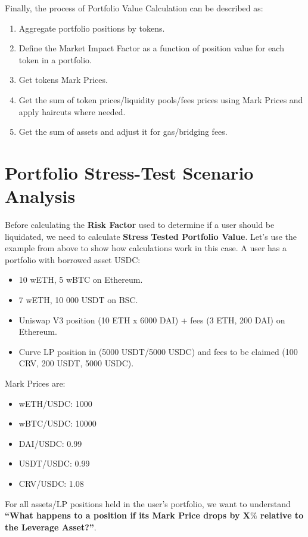\documentclass[conference]{IEEEtran}
\begin{document}
Finally, the process of Portfolio Value Calculation can be described as:
\begin{enumerate}
	\item Aggregate portfolio positions by tokens.
	\item Define the Market Impact Factor as a function of position value for each token in a portfolio.
	\item Get tokens Mark Prices.
	\item Get the sum of token prices/liquidity pools/fees prices using Mark Prices and apply haircuts where needed.
	\item Get the sum of assets and adjust it for gas/bridging fees.
\end{enumerate}

\section{Portfolio Stress-Test Scenario Analysis}
Before calculating the \textbf{Risk Factor} used to determine if a user should be liquidated, we need to calculate \textbf{Stress Tested Portfolio Value}. Let’s use the example from above to show how calculations work in this case. A user has a portfolio with borrowed asset USDC:

\begin{itemize}
	\item 10 wETH, 5 wBTC on Ethereum.
	\item 7 wETH, 10 000 USDT on BSC.
	\item Uniswap V3 position (10 ETH x 6000 DAI) + fees (3 ETH, 200 DAI) on Ethereum.
	\item Curve LP position in (5000 USDT/5000 USDC) and fees to be claimed (100 CRV, 200 USDT, 5000 USDC).
\end{itemize}

Mark Prices are:

\begin{itemize}
	\item wETH/USDC: 1000
	\item wBTC/USDC: 10000
	\item DAI/USDC: 0.99
	\item USDT/USDC: 0.99
	\item CRV/USDC: 1.08
\end{itemize}

For all assets/LP positions held in the user's portfolio, we want to understand \textbf{“What happens to a position if its Mark Price drops by X$\%$ relative to the Leverage Asset?”}. 
\end{document}
